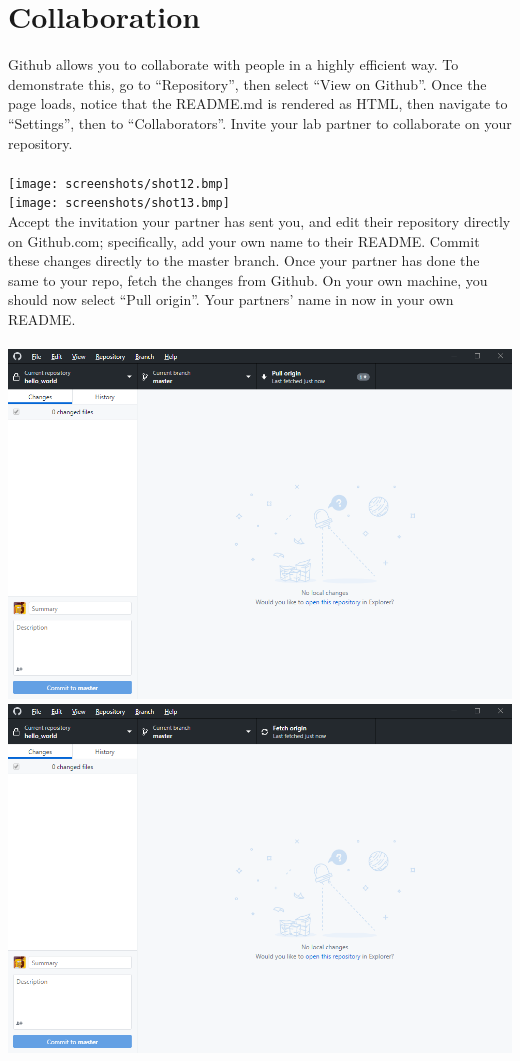 \documentclass[12pt, letter]{article}
\begin{document}
    \section{Collaboration}
    Github allows you to collaborate with people in a highly efficient way. To demonstrate this, go to ``Repository'', then select ``View on Github''. Once the page loads, notice that the README.md is rendered as HTML, then navigate to ``Settings'', then to ``Collaborators''. Invite your lab partner to collaborate on your repository. \\ \\ %
    \texttt{[image: screenshots/shot12.bmp]} \\
    \texttt{[image: screenshots/shot13.bmp]}
    \\
    Accept the invitation your partner has sent you, and edit their repository directly on Github.com; specifically, add your own name to their README. Commit these changes directly to the master branch. Once your partner has done the same to your repo, fetch the changes from Github. On your own machine, you should now select ``Pull origin''. Your partners' name in now in your own README. \\ \\ %
    \includegraphics{screenshots/shot14.bmp} \\
    \includegraphics{screenshots/shot15.bmp}
\end{document}
